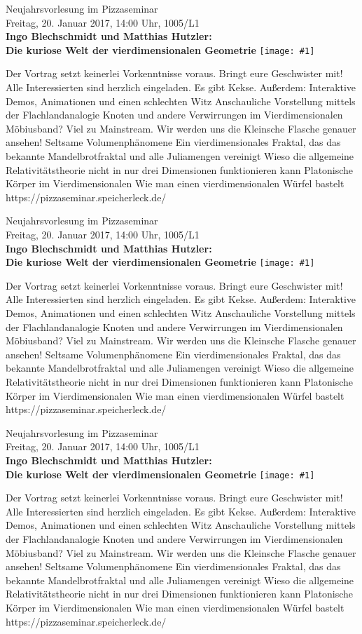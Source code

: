 \documentclass[a4paper,ngerman,landscape]{scrartcl}
\begin{document}
\newcommand{\blurb}[1]{\begin{center}
  \huge
  \vspace*{0.0em}
  Neujahrsvorlesung im Pizzaseminar \\
  Freitag, 20. Januar 2017, 14:00 Uhr, 1005/L1 \\
  \Huge
  \textbf{Ingo Blechschmidt und Matthias Hutzler: \\ Die kuriose Welt der
  vierdimensionalen Geometrie}
  \vfill
  \vspace{0.3em}
  \texttt{[image: \#1]}
  \vfill

  \Large
  \begin{minipage}{0.92\textwidth}
    \renewcommand{\baselinestretch}{1.3}

    \setlength\parskip{\medskipamount}
    \vspace{0.3em}
    Der Vortrag setzt keinerlei Vorkenntnisse voraus. Bringt eure Geschwister
    mit! Alle Interessierten sind herzlich eingeladen. Es gibt Kekse. Außerdem:
    Interaktive Demos, Animationen und einen schlechten Witz
    \textbullet{} Anschauliche Vorstellung mittels der
    Flachlandanalogie
    \textbullet{} Knoten und andere Verwirrungen im Vierdimensionalen
    \textbullet{} Möbiusband? Viel zu Mainstream. Wir werden uns die Kleinsche Flasche
    genauer ansehen!
    \textbullet{} Seltsame Volumenphänomene
    \textbullet{} Ein vierdimensionales Fraktal, das das bekannte Mandelbrotfraktal und
    alle Juliamengen vereinigt
    \textbullet{} Wieso die allgemeine Relativitätstheorie nicht in nur drei Dimensionen
    funktionieren kann
    \textbullet{} Platonische Körper im Vierdimensionalen
    \textbullet{} Wie man einen vierdimensionalen Würfel bastelt
    \vspace{0.3em}
    \hfill\small \textsf{https:/$\!$/pizzaseminar.speicherleck.de/}
  \end{minipage}
\end{center}}

\blurb{great-grand-120-cell}
\blurb{120-cell}
\blurb{flatlandthefilm}
\end{document}

